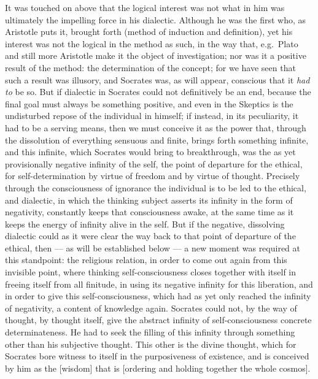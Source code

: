 It was touched on above that the logical interest was not
what in him was ultimately the impelling force in his
dialectic. Although he was the first who, as Aristotle
puts it, brought forth 
(method of induction and definition), yet
his interest was not the logical in the method as such,
in the way that, e.g.\ Plato and still more Aristotle make
it the object of investigation; nor was it a positive result of the method: the determination of the concept; for we have
seen that such a result was illusory, and Socrates was,
as will appear, conscious that it \emph{had to} be so. But
if dialectic in Socrates could not definitively be an end, because the final goal must always be something positive, and even
in the Skeptics is the undisturbed repose of the individual in himself; if
instead, in its peculiarity, it had to be a serving means, then we must conceive it as the power that, through the dissolution of everything
sensuous and finite, brings forth something infinite, and this infinite, which Socrates would bring to breakthrough, was the as yet provisionally negative infinity of the self,
the point of departure for the ethical, for self-determination by virtue
of freedom and by virtue of thought. Precisely through the consciousness of ignorance the individual is to be led to the ethical, and dialectic, in which the thinking subject asserts its infinity
in the form of negativity, constantly keeps that consciousness awake, at the same time as it keeps the energy of infinity alive in the self. But if the negative, dissolving
dialectic could as it were clear the way back to that point of departure of the ethical, then --- as will be established
below --- a new moment was required at this standpoint:
the religious relation, in order to come out again from this invisible point, where thinking self-consciousness closes together with itself in freeing itself from all finitude, in
using its negative infinity for this liberation, and
in order to give this self-consciousness, which had as yet only
reached the infinity of negativity, a content of knowledge again. Socrates could not, by the way of thought, by thought itself, give the abstract infinity of self-consciousness concrete determinateness. He
had to seek the filling of this infinity through something other
than his subjective thought. This other is the divine
thought, which for Socrates bore witness to itself in the purposiveness of existence, and is conceived by him as the  [wisdom] that is
 [ordering and holding together the whole cosmos].
